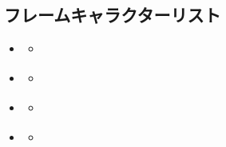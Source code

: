 \documentclass[letterpaper,10pt,dvipdfmx]{sphinxmanual}
\begin{document}
\subsection{フレームキャラクターリスト}
\label{\detokenize{auto/frameActionlist:characterlist-act-frame}}\label{\detokenize{auto/frameActionlist:id89}}
\begin{sphinxShadowBox}
\begin{itemize}
\item {} 
\sphinxAtStartPar
{}\label{\detokenize{auto/frameActionlist:id260}}{\hyperref[\detokenize{auto/frameActionlist:id91}]{}}
\begin{itemize}
\item {} 
\sphinxAtStartPar
{}\label{\detokenize{auto/frameActionlist:id261}}{\hyperref[\detokenize{auto/frameActionlist:char-reanimator}]{}}

\end{itemize}

\item {} 
\sphinxAtStartPar
{}\label{\detokenize{auto/frameActionlist:id262}}{\hyperref[\detokenize{auto/frameActionlist:id93}]{}}
\begin{itemize}
\item {} 
\sphinxAtStartPar
{}\label{\detokenize{auto/frameActionlist:id263}}{\hyperref[\detokenize{auto/frameActionlist:char-darklord}]{}}

\end{itemize}

\item {} 
\sphinxAtStartPar
{}\label{\detokenize{auto/frameActionlist:id264}}{\hyperref[\detokenize{auto/frameActionlist:id95}]{}}
\begin{itemize}
\item {} 
\sphinxAtStartPar
{}\label{\detokenize{auto/frameActionlist:id265}}{\hyperref[\detokenize{auto/frameActionlist:char-chariot}]{}}

\end{itemize}

\item {} 
\sphinxAtStartPar
{}\label{\detokenize{auto/frameActionlist:id266}}{\hyperref[\detokenize{auto/frameActionlist:id97}]{}}
\begin{itemize}
\item {} 
\sphinxAtStartPar
{}\label{\detokenize{auto/frameActionlist:id267}}{\hyperref[\detokenize{auto/frameActionlist:char-giant}]{}}


\end{itemize}
\end{itemize}
\end{sphinxShadowBox}
\end{document}
